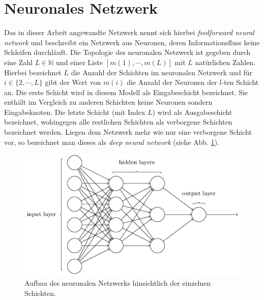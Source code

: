 \section{Neuronales Netzwerk}
Das in dieser Arbeit angewandte Netzwerk nennt sich hierbei \textit{feedforward neural network} und beschreibt ein Netzwerk aus Neuronen, deren Informationsfluss keine Schleifen durchläuft. Die Topologie des neuronalen Netzwerk ist gegeben durch eine Zahl $L \in \mathbb{N}$ und einer Liste $[m(1),\cdots ,m(L)]$ mit $L$ natürlichen Zahlen. Hierbei bezeichnet $L$ die Anzahl der Schichten im neuronalen Netzwerk und für $i \in \{2,\cdots ,L\}$ gibt der Wert von $m(i)$ die Anzahl der Neuronen der $l$-ten Schicht an. Die erste Schicht wird in diesem Modell als Eingabeschicht bezeichnet. Sie enthält im Vergleich zu anderen Schichten keine Neuronen sondern Eingabeknoten. Die letzte Schicht (mit Index $L$) wird als Ausgabeschicht bezeichnet, wohingegen alle restlichen Schichten als verborgene Schichten bezeichnet werden. Liegen dem Netzwerk mehr wie nur eine verborgene Schicht vor, so bezeichnet man dieses als \textit{deep neural network} (siehe Abb. \ref{fig:neural_network_extended}).
\begin{figure}[hbt]
	\centering
	\includegraphics[scale=0.6]{Bilder/neural_network_extended}
	\caption{Aufbau des neuronalen Netzwerks hinsichtlich der einzelnen Schichten. \cite{nielson:2017}} 
	\label{fig:neural_network_extended} 
\end{figure}


